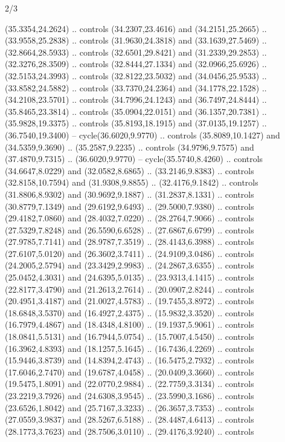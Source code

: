 \begin{flagdescription}{2/3}
\begin{scope}[yshift=\flagwidth,scale=\flagwidth/1241.93737]
\begin{scope}[y=-1mm, x=1mm,draw=gold,fill=blue,line join=miter,miter limit=4,line width=1.8\lw]
\begin{scope}[y=1mm, x=1mm, yscale=-1,shift={(573.68mm+\str,145.75)}]
\begin{scope}[scale=1.35,shift={(-9,-3)}]
\begin{scope}[scale=0.55]
\begin{scope}[scale=1.333]
    (35.3354,24.2624) .. controls (34.2307,23.4616) and (34.2151,25.2665) ..
    (33.9558,25.2838) .. controls (31.9630,24.3818) and (33.1639,27.5469) ..
    (32.8664,28.5933) .. controls (32.6501,29.8421) and (31.2339,29.2853) ..
    (32.3276,28.3509) .. controls (32.8444,27.1334) and (32.0966,25.6926) ..
    (32.5153,24.3993) .. controls (32.8122,23.5032) and (34.0456,25.9533) ..
    (33.8582,24.5882) .. controls (33.7370,24.2364) and (34.1778,22.1528) ..
    (34.2108,23.5701) .. controls (34.7996,24.1243) and (36.7497,24.8444) ..
    (35.8465,23.3814) .. controls (35.0904,22.0151) and (36.1357,20.7381) ..
    (35.9828,19.3375) .. controls (35.8193,18.1915) and (37.0135,19.1257) ..
    (36.7540,19.3400) -- cycle(36.6020,9.9770) .. controls (35.8089,10.1427) and
    (34.5359,9.3690) .. (35.2587,9.2235) .. controls (34.9796,9.7575) and
    (37.4870,9.7315) .. (36.6020,9.9770) -- cycle(35.5740,8.4260) .. controls
    (34.6647,8.0229) and (32.0582,8.6865) .. (33.2146,9.8383) .. controls
    (32.8158,10.7594) and (31.9308,9.8855) .. (32.4176,9.1842) .. controls
    (31.8806,8.9302) and (30.9692,9.1887) .. (31.2837,8.1331) .. controls
    (30.8779,7.1349) and (29.6192,9.6493) .. (29.5000,7.9380) .. controls
    (29.4182,7.0860) and (28.4032,7.0220) .. (28.2764,7.9066) .. controls
    (27.5329,7.8248) and (26.5590,6.6528) .. (27.6867,6.6799) .. controls
    (27.9785,7.7141) and (28.9787,7.3519) .. (28.4143,6.3988) .. controls
    (27.6107,5.0120) and (26.3602,3.7411) .. (24.9109,3.0486) .. controls
    (24.2005,2.5794) and (23.3429,2.9983) .. (24.2867,3.6355) .. controls
    (25.0452,4.3031) and (24.6395,5.0135) .. (23.9313,4.1415) .. controls
    (22.8177,3.4790) and (21.2613,2.7614) .. (20.0907,2.8244) .. controls
    (20.4951,3.4187) and (21.0027,4.5783) .. (19.7455,3.8972) .. controls
    (18.6848,3.5370) and (16.4927,2.4375) .. (15.9832,3.3520) .. controls
    (16.7979,4.4867) and (18.4348,4.8100) .. (19.1937,5.9061) .. controls
    (18.0841,5.5131) and (16.7944,5.0754) .. (15.7007,4.5450) .. controls
    (16.3962,4.8393) and (18.1257,5.1645) .. (16.7436,4.2269) .. controls
    (15.9446,3.8739) and (14.8394,2.4743) .. (16.5475,2.7932) .. controls
    (17.6046,2.7470) and (19.6787,4.0458) .. (20.0409,3.3660) .. controls
    (19.5475,1.8091) and (22.0770,2.9884) .. (22.7759,3.3134) .. controls
    (23.2219,3.7926) and (24.6308,3.9545) .. (23.5990,3.1686) .. controls
    (23.6526,1.8042) and (25.7167,3.3233) .. (26.3657,3.7353) .. controls
    (27.0559,3.9837) and (28.5267,6.5188) .. (28.4487,4.6413) .. controls
    (28.1773,3.7623) and (28.7506,3.0110) .. (29.4176,3.9240) .. controls

\end{scope}
\end{scope}
\end{scope}
\end{scope}
\end{scope}
\end{scope}
\end{flagdescription}
